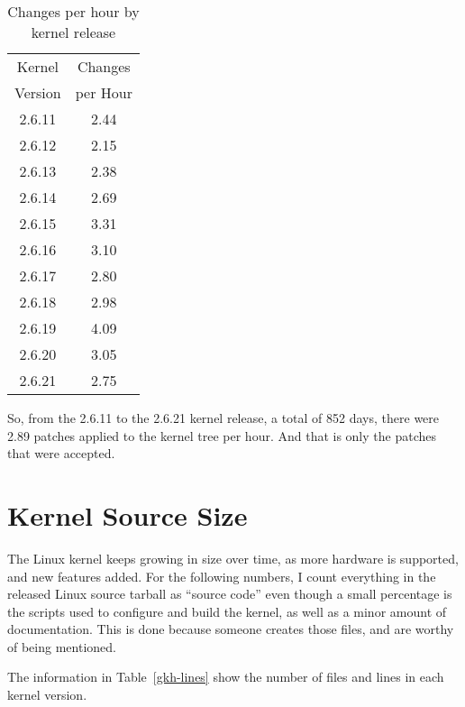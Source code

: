 \documentclass[final]{ols}
\begin{document}
\begin{table}%
\begin{center}
\begin{tabular}{|c|c|}
\hline
\multicolumn{1}{|c|}{Kernel}  & \multicolumn{1}{|c|}{Changes} \\
\multicolumn{1}{|c|}{Version} & \multicolumn{1}{|c|}{per Hour}\\
\hline
\hline
\rule[-0.1ex]{0pt}{2.5ex}2.6.11	& 2.44 	\\
2.6.12	& 2.15 	\\
2.6.13	& 2.38 	\\
2.6.14	& 2.69 	\\
2.6.15	& 3.31 	\\
2.6.16	& 3.10 	\\
2.6.17	& 2.80 	\\
2.6.18	& 2.98 	\\
2.6.19	& 4.09 	\\
2.6.20	& 3.05 	\\
2.6.21	& 2.75 	\\
\hline
\end{tabular}
\caption{Changes per hour by kernel release}
\label{gkh-hour}
\end{center}
\end{table}

So, from the 2.6.11 to the 2.6.21 kernel release, a total of 852 days,
there were 2.89 patches applied to the kernel tree per hour.  And that
is only the patches that were accepted.


\section {Kernel Source Size}

The Linux kernel keeps growing in size over time, as more hardware is
supported, and new features added.  For the following numbers, I count
everything in the released Linux source tarball as ``source code'' even
though a small percentage is the scripts used to configure and build the
kernel, as well as a minor amount of documentation.  This is done
because someone creates those files, and are worthy of being mentioned.

The information in Table~\ref{gkh-lines} show the number of files and
lines in each kernel version.
\end{document}
